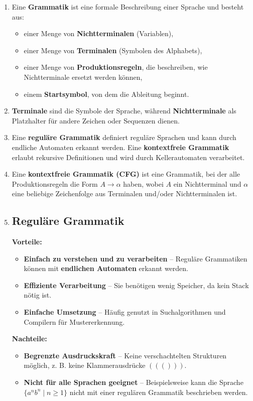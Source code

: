 \documentclass{article}
\begin{document}
\begin{enumerate}
	\item Eine \textbf{Grammatik} ist eine formale Beschreibung einer Sprache und besteht aus:
	\begin{itemize}
		\item einer Menge von \textbf{Nichtterminalen} (Variablen),
		\item einer Menge von \textbf{Terminalen} (Symbolen des Alphabets),
		\item einer Menge von \textbf{Produktionsregeln}, die beschreiben, wie Nichtterminale ersetzt werden können,
		\item einem \textbf{Startsymbol}, von dem die Ableitung beginnt.
	\end{itemize}
	
	\item \textbf{Terminale} sind die Symbole der Sprache, während \textbf{Nichtterminale} als Platzhalter für andere Zeichen oder Sequenzen dienen.
	\item Eine \textbf{reguläre Grammatik} definiert reguläre Sprachen und kann durch endliche Automaten erkannt werden. Eine \textbf{kontextfreie Grammatik} erlaubt rekursive Definitionen und wird durch Kellerautomaten verarbeitet.
	
	\item Eine \textbf{kontextfreie Grammatik (CFG)} ist eine Grammatik, bei der alle Produktionsregeln die Form $A \rightarrow \alpha$ haben, wobei $A$ ein Nichtterminal und $\alpha$ eine beliebige Zeichenfolge aus Terminalen und/oder Nichtterminalen ist.
	
	\item \subsection*{Reguläre Grammatik}
	\textbf{Vorteile:}
	\begin{itemize}
		\item \textbf{Einfach zu verstehen und zu verarbeiten} – Reguläre Grammatiken können mit \textbf{endlichen Automaten} erkannt werden.
		\item \textbf{Effiziente Verarbeitung} – Sie benötigen wenig Speicher, da kein Stack nötig ist.
		\item \textbf{Einfache Umsetzung} – Häufig genutzt in Suchalgorithmen und Compilern für Mustererkennung.
	\end{itemize}
	
	\textbf{Nachteile:}
	\begin{itemize}
		\item \textbf{Begrenzte Ausdruckskraft} – Keine verschachtelten Strukturen möglich, z. B. keine Klammerausdrücke $((()))$.
		\item \textbf{Nicht für alle Sprachen geeignet} – Beispielsweise kann die Sprache $\{ a^n b^n \mid n \geq 1 \}$ nicht mit einer regulären Grammatik beschrieben werden.
	\end{itemize}
	

\end{enumerate}
\end{document}
